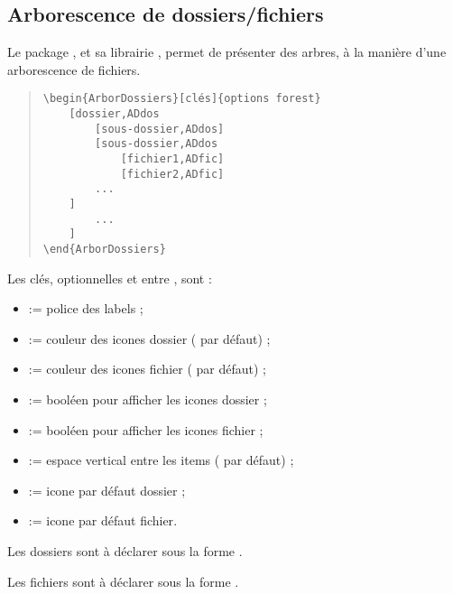 \documentclass[11pt,a4paper]{ltxdoc}
\begin{document}
\pagebreak

\subsection{Arborescence de dossiers/fichiers}

Le package , et sa librairie , permet de présenter des arbres, à la manière d'une arborescence de fichiers.

\begin{quote}
\begin{verbatim}
\begin{ArborDossiers}[clés]{options forest}
    [dossier,ADdos
        [sous-dossier,ADdos]
        [sous-dossier,ADdos
            [fichier1,ADfic]
            [fichier2,ADfic]
        ...
    ]
        ...
    ]
\end{ArborDossiers}
\end{verbatim}
\end{quote}

Les \textsf{clés}, optionnelles et entre \MontreCode{[...]}, sont :

\begin{itemize}
	\item {} := police des labels ;
	\item {} := couleur des icones \textsf{dossier} ( par défaut) ;
	\item {} := couleur des icones \textsf{fichier} ( par défaut) ;
	\item {} := booléen pour afficher les icones \textsf{dossier} ;
	\item {} := booléen pour afficher les icones \textsf{fichier} ;
	\item {} := espace vertical entre les items (\MontreCode{0.15em} par défaut) ;
	\item {} := icone par défaut \textsf{dossier} ;
	\item {} := icone par défaut \textsf{fichier}.
\end{itemize}

\medskip

Les \textsf{dossiers} sont à déclarer sous la forme .

Les \textsf{fichiers} sont à déclarer sous la forme .

\medskip
\end{document}
